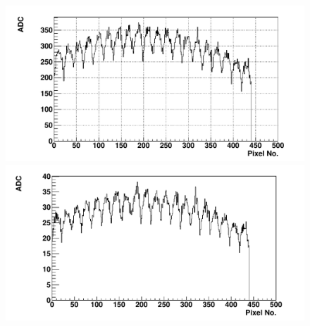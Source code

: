 \begin{figure} %
\includegraphics[width=\textwidth]{chapters/graphs/GainVarsMeas/LL_m04_2016-06-11/Set0and2/meanHist_StandHV_Average_set0and2.pdf}
\caption{}
\vspace{3mm}
\includegraphics[width=\textwidth]{chapters/graphs/GainVarsMeas/LL_m04_2016-06-11/Set0and2/meanHist_LowHV_Average_set0and2.pdf}
\caption{}
\end{figure}

